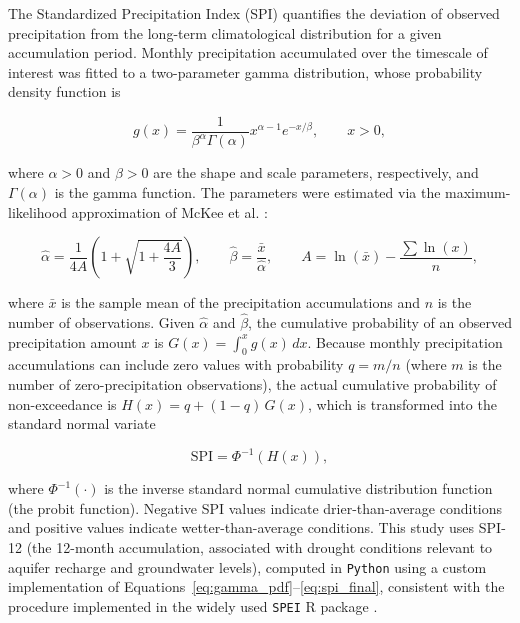 \documentclass[climate,article,submit,moreauthors]{Definitions/mdpi}
\begin{document}
The Standardized Precipitation Index (SPI) \cite{McKee1993} quantifies the
deviation of observed precipitation from the long-term climatological
distribution for a given accumulation period. Monthly precipitation
accumulated over the timescale of interest was fitted to a two-parameter
gamma distribution, whose probability density function is

\begin{equation}
g(x) = \frac{1}{\beta^{\alpha}\Gamma(\alpha)} x^{\alpha - 1} e^{-x/\beta},
\qquad x > 0,
\label{eq:gamma_pdf}
\end{equation}

where $\alpha > 0$ and $\beta > 0$ are the shape and scale parameters,
respectively, and $\Gamma(\alpha)$ is the gamma function. The parameters
were estimated via the maximum-likelihood approximation of McKee et al.
\cite{McKee1993}:

\begin{equation}
\hat{\alpha} = \frac{1}{4A}\left(1 + \sqrt{1 + \frac{4A}{3}}\right),
\qquad \hat{\beta} = \frac{\bar{x}}{\hat{\alpha}}, \qquad
A = \ln(\bar{x}) - \frac{\sum \ln(x)}{n},
\label{eq:gamma_params}
\end{equation}

where $\bar{x}$ is the sample mean of the precipitation accumulations and
$n$ is the number of observations. Given $\hat{\alpha}$ and $\hat{\beta}$,
the cumulative probability of an observed precipitation amount $x$ is
$G(x) = \int_0^{x} g(x)\,dx$. Because monthly precipitation accumulations
can include zero values with probability $q = m/n$ (where $m$ is the number
of zero-precipitation observations), the actual cumulative probability of
non-exceedance is $H(x) = q + (1 - q)\,G(x)$, which is transformed into the
standard normal variate

\begin{equation}
\mathrm{SPI} = \Phi^{-1}\!\left(H(x)\right),
\label{eq:spi_final}
\end{equation}

where $\Phi^{-1}(\cdot)$ is the inverse standard normal cumulative
distribution function (the probit function). Negative SPI values indicate
drier-than-average conditions and positive values indicate wetter-than-average
conditions. This study uses SPI-12 (the 12-month accumulation, associated
with drought conditions relevant to aquifer recharge and groundwater
levels), computed in \texttt{Python} using a custom implementation of
Equations~\eqref{eq:gamma_pdf}--\eqref{eq:spi_final}, consistent with the
procedure implemented in the widely used \texttt{SPEI} R package
\cite{BegueriaVicenteSerrano2014}.
\end{document}
